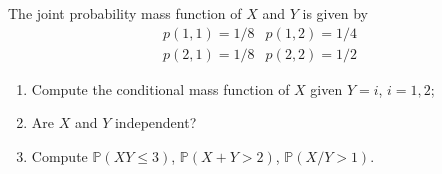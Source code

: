 \documentclass{article}[12pt]
\newenvironment{problem}[1]
  {\renewcommand\theinnercustomprblm{#1}\innercustomprblm}
  {\endinnercustomprblm}
\renewcommand{\P}{\mathbb{P}}
\begin{document}
\begin{problem}{6.40}\normalfont
The joint probability mass function of $X$ and $Y$ is given by
\begin{equation*}
    \begin{matrix}
        p(1,1) = 1/8 & p(1,2) = 1/4
        \\
        p(2,1) = 1/8 & p(2,2) = 1/2
    \end{matrix}
\end{equation*}
\begin{enumerate}[label=(\alph*)]
    \item Compute the conditional mass function of $X$ given $Y = i$, $i=1,2$;
    \item Are $X$ and $Y$ independent?
    \item Compute $\P(XY \leqslant 3)$,  $\P(X + Y > 2)$,  $\P(X/Y > 1)$.
\end{enumerate}
\end{problem}
\end{document}
